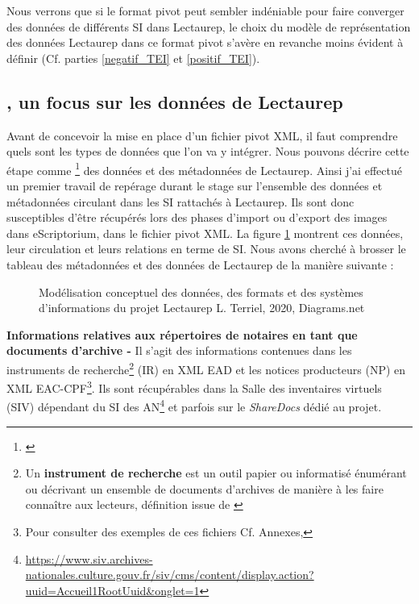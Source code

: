Nous verrons que si le format pivot peut sembler indéniable pour faire converger des données de différents SI dans Lectaurep, le choix du modèle de représentation des données Lectaurep dans ce format pivot s'avère en revanche moins évident à définir (Cf. parties \ref{negatif_TEI} et \ref{positif_TEI}). 

\subsection{, un focus sur les données de Lectaurep}\label{Circonscrire un monde de données}

Avant de concevoir la mise en place d'un fichier pivot XML, il faut comprendre quels sont les types de données que l'on va y intégrer. Nous pouvons décrire cette étape comme \footnote{\cite{poupeau_visite_2019}} des données et des métadonnées de Lectaurep. Ainsi j'ai effectué un premier travail de repérage durant le stage sur l'ensemble des données et métadonnées circulant dans les SI rattachés à Lectaurep. Ils sont donc susceptibles d'être récupérés lors des phases d'import ou d'export des images dans eScriptorium, dans le fichier pivot XML.
La figure \ref{fig:modélisation_données_lectaurep} montrent ces données, leur circulation et leurs relations en terme de SI. Nous avons cherché à brosser le tableau des métadonnées et des données de Lectaurep de la manière suivante :\\

\begin{figure}[H]
    \centering
    \centerline{}
    \caption{Modélisation conceptuel des données, des formats et des systèmes d'informations du projet Lectaurep \textcopyright L. Terriel, 2020, Diagrams.net}
    \label{fig:modélisation_données_lectaurep}
\end{figure}

\textbf{Informations relatives aux répertoires de notaires en tant que documents d'archive -} Il s'agit des informations contenues dans les instruments de recherche\footnote{Un \textbf{instrument de recherche} est un outil papier ou informatisé énumérant ou décrivant un ensemble de documents d'archives de manière à les faire connaître aux lecteurs, définition issue de \cite{noauthor_abrege_2020}} (IR) en XML EAD et les notices producteurs (NP) 
en XML EAC-CPF\footnote{Pour consulter des exemples de ces fichiers Cf. Annexes, }.
Ils sont récupérables dans la Salle des inventaires virtuels (SIV) dépendant du SI des AN\footnote{\url{https://www.siv.archives-nationales.culture.gouv.fr/siv/cms/content/display.action?uuid=Accueil1RootUuid&onglet=1}} et parfois sur le \textit{ShareDocs} dédié au projet.\\

